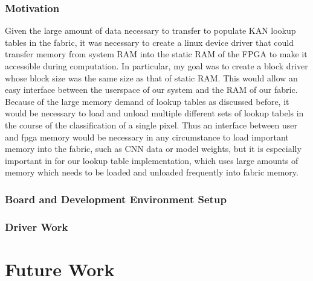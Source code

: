 \documentclass{article}
\begin{document}
\subsubsection{Motivation}
Given the large amount of data necessary to transfer to populate KAN lookup tables in the fabric, it was necessary to create a linux device driver that could transfer memory from system RAM into the static RAM of the FPGA to make it accessible during computation. In particular, my goal was to create a block driver whose block size was the same size as that of static RAM. This would allow an easy interface between the userspace of our system and the RAM of our fabric. Because of the large memory demand of lookup tables as discussed before, it would be necessary to load and unload multiple different sets of lookup tabels in the course of the classification of a single pixel. Thus an interface between user and fpga memory would be necessary in any circumstance to load important memory into the fabric, such as CNN data or model weights, but it is especially important in for our lookup table implementation, which uses large amounts of memory which needs to be loaded and unloaded frequently into fabric memory.  %



\subsubsection{Board and Development Environment Setup}

\subsubsection{Driver Work} %


\section{Future Work}
\end{document}
